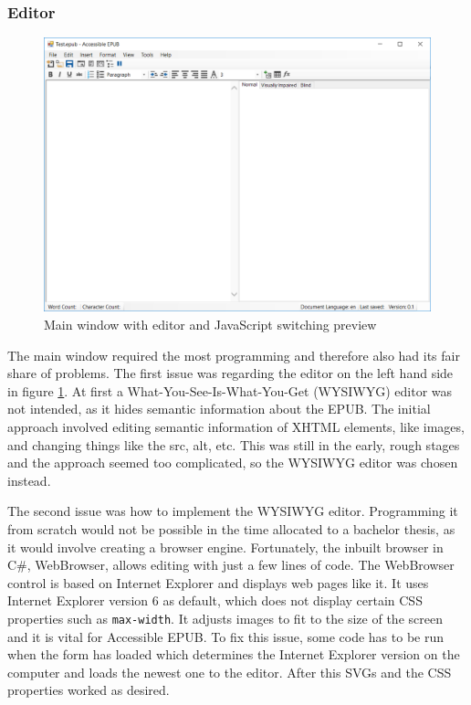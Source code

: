 \subsubsection{Editor}

\begin{figure}
	\includegraphics[width=\linewidth]{figures/formJs.png}	
	\caption{Main window with editor and JavaScript switching preview}
	\label{fig:formJs}
\end{figure}

The main window required the most programming and therefore also had its fair share of problems. The first issue was regarding the editor on the left hand side in figure \ref{fig:formJs}. At first a What-You-See-Is-What-You-Get (WYSIWYG) editor was not intended, as it hides semantic information about the EPUB. The initial approach involved editing semantic information of XHTML elements, like images, and changing things like the src, alt, etc. This was still in the early, rough stages and the approach seemed too complicated, so the WYSIWYG editor was chosen instead. 

The second issue was how to implement the WYSIWYG editor. Programming it from scratch would not be possible in the time allocated to a bachelor thesis, as it would involve creating a browser engine. Fortunately, the inbuilt browser in C\#, WebBrowser, allows editing with just a few lines of code. The WebBrowser control is based on Internet Explorer and displays web pages like it. It uses Internet Explorer version 6 as default, which does not display certain CSS properties such as \lstinline|max-width|. It adjusts images to fit to the size of the screen and it is vital for Accessible EPUB. To fix this issue, some code has to be run when the form has loaded which determines the Internet Explorer version on the computer and loads the newest one to the editor. After this SVGs and the CSS properties worked as desired. 

